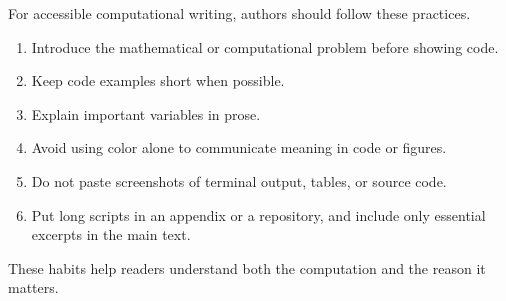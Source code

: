For accessible computational writing, authors should follow these practices.

\begin{enumerate}
  \item Introduce the mathematical or computational problem before showing code.
  \item Keep code examples short when possible.
  \item Explain important variables in prose.
  \item Avoid using color alone to communicate meaning in code or figures.
  \item Do not paste screenshots of terminal output, tables, or source code.
  \item Put long scripts in an appendix or a repository, and include only essential excerpts in the main text.
\end{enumerate}

These habits help readers understand both the computation and the reason it matters.